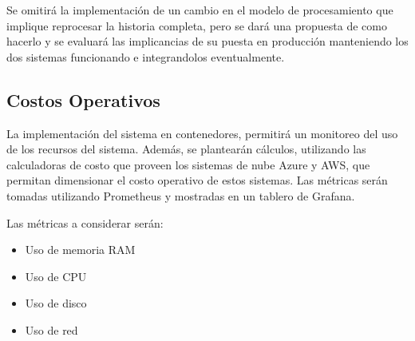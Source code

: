 Se omitirá la implementación de un cambio en el modelo de procesamiento que implique reprocesar la historia completa, 
pero se dará una propuesta de como hacerlo y se evaluará las implicancias de su puesta en producción manteniendo los dos sistemas funcionando e integrandolos eventualmente.

\subsection{Costos Operativos}

La implementación del sistema en contenedores, permitirá un monitoreo del uso de los recursos del sistema.
Además, se plantearán cálculos, utilizando las calculadoras de costo que proveen los sistemas de nube Azure y AWS, que permitan dimensionar el costo operativo de estos sistemas.
Las métricas serán tomadas utilizando Prometheus y mostradas en un tablero de Grafana.

Las métricas a considerar serán:
\begin{itemize}
    \item Uso de memoria RAM
    \item Uso de CPU
    \item Uso de disco
    \item Uso de red
\end{itemize}

\newpage